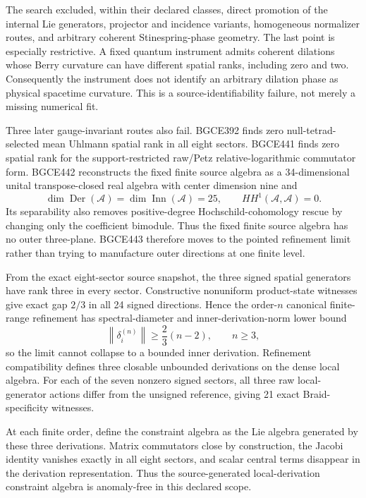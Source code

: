\documentclass[11pt]{article}
\theoremstyle{definition}
\theoremstyle{remark}
\begin{document}
The search excluded, within their declared classes, direct promotion of the internal Lie generators, projector and incidence variants, homogeneous normalizer routes, and arbitrary coherent Stinespring-phase geometry. The last point is especially restrictive. A fixed quantum instrument admits coherent dilations whose Berry curvature can have different spatial ranks, including zero and two. Consequently the instrument does not identify an arbitrary dilation phase as physical spacetime curvature. This is a source-identifiability failure, not merely a missing numerical fit.

Three later gauge-invariant routes also fail. BGCE392 finds zero null-tetrad-selected mean Uhlmann spatial rank in all eight sectors. BGCE441 finds zero spatial rank for the support-restricted raw/Petz relative-logarithmic commutator form. BGCE442 reconstructs the fixed finite source algebra as a 34-dimensional unital transpose-closed real algebra with center dimension nine and
\begin{equation}
 \dim\operatorname{Der}(\mathcal A)
 =\dim\operatorname{Inn}(\mathcal A)=25,
 \qquad
 HH^1(\mathcal A,\mathcal A)=0.
\end{equation}
Its separability also removes positive-degree Hochschild-cohomology rescue by changing only the coefficient bimodule. Thus the fixed finite source algebra has no outer three-plane. BGCE443 therefore moves to the pointed refinement limit rather than trying to manufacture outer directions at one finite level.

From the exact eight-sector source snapshot, the three signed spatial generators have rank three in every sector. Constructive nonuniform product-state witnesses give exact gap $2/3$ in all 24 signed directions. Hence the order-$n$ canonical finite-range refinement has spectral-diameter and inner-derivation-norm lower bound
\begin{equation}
 \left\lVert\delta_i^{(n)}\right\rVert\ge\frac23(n-2),
 \qquad n\ge3,
\end{equation}
so the limit cannot collapse to a bounded inner derivation. Refinement compatibility defines three closable unbounded derivations on the dense local algebra. For each of the seven nonzero signed sectors, all three raw local-generator actions differ from the unsigned reference, giving 21 exact Braid-specificity witnesses.

At each finite order, define the constraint algebra as the Lie algebra generated by these three derivations. Matrix commutators close by construction, the Jacobi identity vanishes exactly in all eight sectors, and scalar central terms disappear in the derivation representation. Thus the source-generated local-derivation constraint algebra is anomaly-free in this declared scope.
\end{document}
